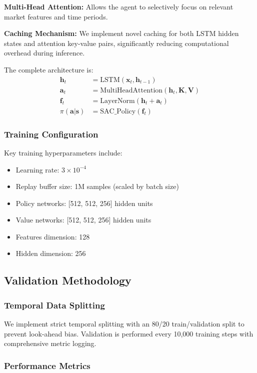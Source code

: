 \documentclass[conference]{IEEEtran}
\begin{document}
\textbf{Multi-Head Attention:} Allows the agent to selectively focus on relevant market features and time periods.

\textbf{Caching Mechanism:} We implement novel caching for both LSTM hidden states and attention key-value pairs, significantly reducing computational overhead during inference.

The complete architecture is:
\begin{align}
\mathbf{h}_t &= \text{LSTM}(\mathbf{x}_t, \mathbf{h}_{t-1}) \\
\mathbf{a}_t &= \text{MultiHeadAttention}(\mathbf{h}_t, \mathbf{K}, \mathbf{V}) \\
\mathbf{f}_t &= \text{LayerNorm}(\mathbf{h}_t + \mathbf{a}_t) \\
\pi(\mathbf{a}|\mathbf{s}) &= \text{SAC\_Policy}(\mathbf{f}_t)
\end{align}

\subsubsection{Training Configuration}

Key training hyperparameters include:
\begin{itemize}
\item Learning rate: $3 \times 10^{-4}$
\item Replay buffer size: 1M samples (scaled by batch size)
\item Policy networks: [512, 512, 256] hidden units
\item Value networks: [512, 512, 256] hidden units
\item Features dimension: 128
\item Hidden dimension: 256
\end{itemize}

\subsection{Validation Methodology}

\subsubsection{Temporal Data Splitting}

We implement strict temporal splitting with an 80/20 train/validation split to prevent look-ahead bias. Validation is performed every 10,000 training steps with comprehensive metric logging.

\subsubsection{Performance Metrics}
\end{document}
